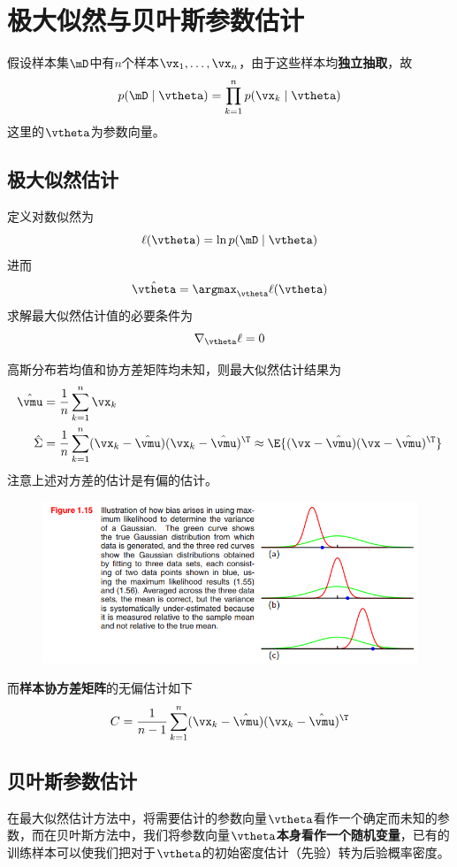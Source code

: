 
\section{极大似然与贝叶斯参数估计} %

假设样本集$\mD$中有$n$个样本$\vx_1,\ldots,\vx_n$，由于这些样本均\textbf{独立抽取}，故
\[p(\mD\mid\vtheta)=\prod_{k=1}^np(\vx_k\mid\vtheta)\]
这里的$\vtheta$为参数向量。

\subsection{极大似然估计}
定义对数似然为
\[\ell(\vtheta)=\ln p(\mD\mid\vtheta)\]
进而
\[\hat{\vtheta}=\argmax_{\vtheta}\ell(\vtheta)\]
求解最大似然估计值的必要条件为
\[\nabla_{\vtheta}\ell = 0\]

高斯分布若均值和协方差矩阵均未知，则最大似然估计结果为
\[\begin{aligned}
\hat{\vmu} &= \frac{1}{n}\sum_{k=1}^n\vx_k\\
\hat{\Sigma} &= \frac{1}{n}\sum_{k=1}^n(\vx_k-\hat{\vmu})(\vx_k-\hat{\vmu})^\T\approx\E{(\vx-\hat{\vmu})(\vx-\hat{\vmu})^\T}
\end{aligned}\]
注意上述对方差的估计是有偏的估计。
\begin{figure}[H]
\centering
\includegraphics[width=0.8\linewidth]{fig/biased_ML_Gaussian.png}
\end{figure}

而\textbf{样本协方差矩阵}的无偏估计如下
\[C=\frac{1}{n-1}\sum_{k=1}^n(\vx_k-\hat{\vmu})(\vx_k-\hat{\vmu})^\T\]

\subsection{贝叶斯参数估计}
在最大似然估计方法中，将需要估计的参数向量$\vtheta$看作一个确定而未知的参数，而在贝叶斯方法中，我们将参数向量$\vtheta$\textbf{本身看作一个随机变量}，已有的训练样本可以使我们把对于$\vtheta$的初始密度估计（先验）转为后验概率密度。

